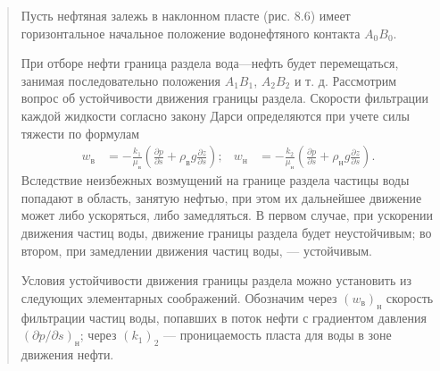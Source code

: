 \documentclass[12pt,a4paper]{article}
\begin{document}
\begin{quote}\sloppy
Пусть нефтяная залежь в наклонном пласте (рис. 8.6) имеет горизонтальное начальное положение водонефтяного контакта $A_0B_0$.

При отборе нефти граница раздела вода---нефть будет перемещаться, занимая последовательно положения $A_1B_1$, $A_2B_2$ и т. д. Рассмотрим вопрос об устойчивости движения границы раздела. Скорости фильтрации каждой жидкости согласно закону Дарси определяются при учете силы тяжести по формулам
\begin{equation}\begin{aligned}
w_\text{в}&=-\frac{k_1}{\mu_\text{в}}\left(\frac{\partial p}{\partial s}+\rho_\text{в}g\frac{\partial z}{\partial s}\right);&w_\text{н}&=-\frac{k_2}{\mu_\text{н}}\left(\frac{\partial p}{\partial s}+\rho_\text{н}g\frac{\partial z}{\partial s}\right).
\end{aligned}\tag{8.39}\label{q9:eq-8-39}\end{equation}
Вследствие неизбежных возмущений на границе раздела частицы воды попадают в область, занятую нефтью, при этом их дальнейшее движение может либо ускоряться, либо замедляться. В первом случае, при ускорении движения частиц воды, движение границы раздела будет неустойчивым; во втором, при замедлении движения частиц воды, --- устойчивым.


Условия устойчивости движения границы раздела можно установить из следующих элементарных соображений. Обозначим через $(w_\text{в})_\text{н}$ скорость фильтрации частиц воды, попавших в поток нефти с градиентом давления $(\partial p/\partial s)_\text{н}$; через $(k_1)_2$ --- проницаемость пласта для воды в зоне движения нефти.


\end{quote}
\end{document}
